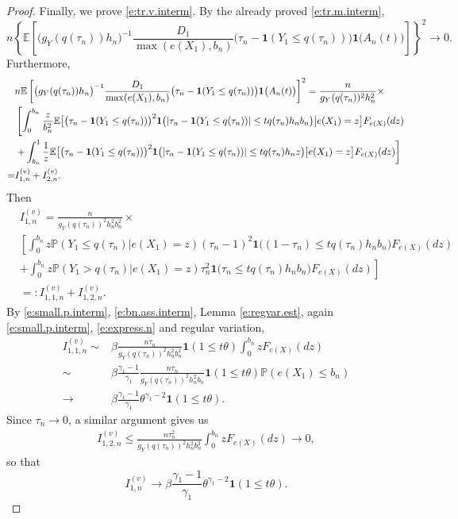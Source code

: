 \documentclass[12pt]{amsart}
\newcommand{\LFe}{F_{e(X)}}
\newcommand{\1}{\mathbbm{1}}
\newcommand{\0}{\mathbf{0}}
\newcommand{\one}{\mathbf{1}}
\newcommand{\E}{\mathbb{E}}
\theoremstyle{plain}
\theoremstyle{definition}
\newcommand{\bbP}{\mathbb{P}}
\begin{document}
\begin{proof}
Finally, we prove \eqref{e:tr.v.interm}.  By the already proved
\eqref{e:tr.m.interm},
$$
n\left\{\E\left[ \bigl(g_Y(q(\tau_n))h_n\bigr)^{-1}\frac{D_1}{\max(e(X_1),b_n)}
  \bigl( \tau_n-\one(Y_1\leq q(\tau_n))\bigr) \one\bigl(
  A_n(t)\bigr)\right]\right\}^2\to 0.
$$
Furthermore,
\begin{align*}
&n\E\left[ \bigl(g_Y(q(\tau_n))h_n\bigr)^{-1}\frac{D_1}{\max(e(X_1),b_n)}
  \bigl( \tau_n-\one(Y_1\leq q(\tau_n))\bigr) \one\bigl( A_n(t)\bigr)\right]^2
=\frac{n}{g_Y(q(\tau_n))^2h_n^2}\times 
\\
\notag & \left[ \int_0^{b_n}
  \frac{z}{b_n^2}\E\bigl[ \bigl( \tau_n-\one(Y_1\leq
  q(\tau_n))\bigr)^2 \one\bigl( |\tau_n-\one(Y_1\leq
  q(\tau_n))|\leq t q(\tau_n)h_nb_n\bigr)
\big| e(X_1)=z\bigr] \LFe(dz) \right.\\
\notag &\left. + \int_{b_n}^1 
     \frac{1}{z}\E\bigl[ \bigl( \tau_n-\one(Y_1\leq
  q(\tau_n))\bigr)^2 \one\bigl( |\tau_n-\one(Y_1\leq
  q(\tau_n))|\leq t q(\tau_n)h_nz\bigr)
\big| e(X_1)=z\bigr] \LFe(dz) \right]\\
\notag =& I_{1,n}^{(v)}+ I_{2,n}^{(v)}.
 \end{align*}
 Then
 \begin{align*}
&I_{1,n}^{(v)}= \frac{n}{g_Y(q(\tau_n))^2h_n^2b_n^2} \times\\
&\left[ \int_0^{b_n} z\bbP(Y_1\leq q(\tau_n)|e(X_1)=z) (\tau_n-1)^2
   \one\bigl( (1-\tau_n )\leq t q(\tau_n)h_nb_n\bigr)
\LFe(dz) \right.\\
& \left.+ \int_0^{b_n} z\bbP(Y_1> q(\tau_n)|e(X_1)=z) \tau_n^2
   \one\bigl( \tau_n\leq t q(\tau_n)h_nb_n\bigr)
\LFe(dz) \right] \\
&=: I_{1,1,n}^{(v)}+I_{1,2,n}^{(v)}. 
 \end{align*}
 By   \eqref{e:small.p.interm}, \eqref{e:bn.ass.interm}, Lemma \ref{e:regvar.est}, again \eqref{e:small.p.interm}, 
\eqref{e:express.n} and regular variation, 
 \begin{align*}
 I_{1,1,n}^{(v)} \sim& \beta
   \frac{n\tau_n}{g_Y(q(\tau_n))^2h_n^2b_n^2}\one(1\leq t\theta)
    \int_0^{b_n} z \LFe(dz) \\
\sim& \beta\frac{\gamma_1-1}{\gamma_1} \frac{n\tau_n}{g_Y(q(\tau_n))^2h_n^2b_n}
\one(1\leq t\theta) \bbP(e(X_1)\leq b_n)\\
\to& \beta\frac{\gamma_1-1}{\gamma_1} \theta^{\gamma_1-2} \one(1\leq
     t\theta). 
 \end{align*}
 Since $\tau_n\to 0$, a similar argument gives us 
 \begin{align*}
 I_{1,2,n}^{(v)} \leq \frac{n\tau_n^2}{g_Y(q(\tau_n))^2h_n^2b_n^2}
     \int_0^{b_n} z \LFe(dz)  \to 0, 
  \end{align*}
  so that 
  \begin{equation*} \label{e:I1n.v.interm}
   I_{1,n}^{(v)} \to \beta\frac{\gamma_1-1}{\gamma_1} \theta^{\gamma_1-2} \one(1\leq
     t\theta). 
\end{equation*}


\end{proof}
\end{document}
